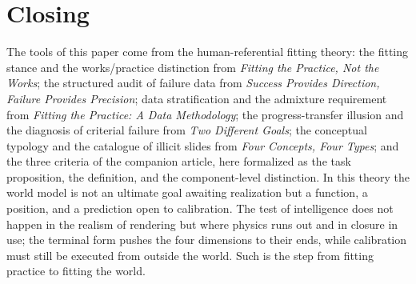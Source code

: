 \documentclass[10pt]{article}
\begin{document}
\section*{Closing}

The tools of this paper come from the human-referential fitting theory: the fitting stance and the works/practice distinction from \emph{Fitting the Practice, Not the Works}\cite{yu2026fitting}; the structured audit of failure data from \emph{Success Provides Direction, Failure Provides Precision}\cite{yu2026failure}; data stratification and the admixture requirement from \emph{Fitting the Practice: A Data Methodology}\cite{yu2026methodology}; the progress-transfer illusion and the diagnosis of criterial failure from \emph{Two Different Goals}\cite{yu2026twogoals}; the conceptual typology and the catalogue of illicit slides from \emph{Four Concepts, Four Types}\cite{yu2026fourconcepts}; and the three criteria of the companion article, here formalized as the task proposition, the definition, and the component-level distinction. In this theory the world model is not an ultimate goal awaiting realization but a function, a position, and a prediction open to calibration. The test of intelligence does not happen in the realism of rendering but where physics runs out and in closure in use; the terminal form pushes the four dimensions to their ends, while calibration must still be executed from outside the world. Such is the step from fitting practice to fitting the world.
\end{document}
